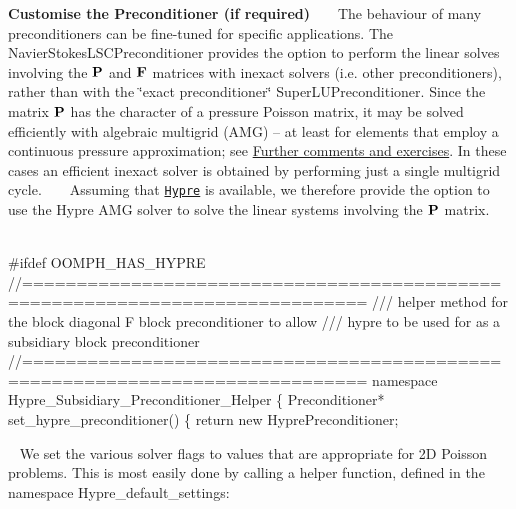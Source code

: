 \begin{DoxyEnumerate}
\item {\bfseries Customise the Preconditioner (if required)} ~\newline
~\newline
 The behaviour of many preconditioners can be fine-\/tuned for specific applications. The {\ttfamily Navier\+Stokes\+L\+S\+C\+Preconditioner} provides the option to perform the linear solves involving the $ {\bf P} $ and $ {\bf F} $ matrices with inexact solvers (i.\+e. other preconditioners), rather than with the \char`\"{}exact preconditioner\char`\"{} {\ttfamily Super\+L\+U\+Preconditioner}. Since the matrix $ {\bf P} $ has the character of a pressure Poisson matrix, it may be solved efficiently with algebraic multigrid (A\+MG) -- at least for elements that employ a continuous pressure approximation; see \hyperlink{index_comm_ex}{Further comments and exercises}. In these cases an efficient inexact solver is obtained by performing just a single multigrid cycle. ~\newline
~\newline
 Assuming that \href{https://computation.llnl.gov/casc/linear_solvers/sls_hypre.html}{\tt {\ttfamily Hypre}} is available, we therefore provide the option to use the {\ttfamily Hypre} A\+MG solver to solve the linear systems involving the $ {\bf P} $ matrix. ~\newline
~\newline
  
\begin{DoxyCodeInclude}
\textcolor{preprocessor}{#ifdef OOMPH\_HAS\_HYPRE}
\textcolor{comment}{//=============================================================================}\textcolor{comment}{}
\textcolor{comment}{/// helper method for the block diagonal F block preconditioner to allow }
\textcolor{comment}{/// hypre to be used for as a subsidiary block preconditioner}
\textcolor{comment}{}\textcolor{comment}{//=============================================================================}
\textcolor{keyword}{namespace }Hypre\_Subsidiary\_Preconditioner\_Helper
\{
 Preconditioner* set\_hypre\_preconditioner()
 \{
  \textcolor{keywordflow}{return} \textcolor{keyword}{new} HyprePreconditioner;

\end{DoxyCodeInclude}
 ~\newline
 We set the various solver flags to values that are appropriate for 2D Poisson problems. This is most easily done by calling a helper function, defined in the namespace {\ttfamily Hypre\+\_\+default\+\_\+settings\+:} ~\newline
~\newline
 

\end{DoxyEnumerate}
